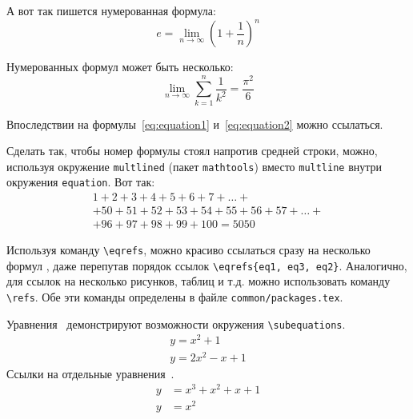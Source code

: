 А вот так пишется нумерованная формула:
\begin{equation}
  \label{eq:equation1}
  e = \lim_{n \to \infty} \left( 1+\frac{1}{n} \right) ^n
\end{equation}

Нумерованных формул может быть несколько:
\begin{equation}
  \label{eq:equation2}
  \lim_{n \to \infty} \sum_{k=1}^n \frac{1}{k^2} = \frac{\pi^2}{6}
\end{equation}

Впоследствии на формулы~\eqref{eq:equation1} и~\eqref{eq:equation2} можно ссылаться.

Сделать так, чтобы номер формулы стоял напротив средней строки, можно,
используя окружение \verb|multlined| (пакет \verb|mathtools|) вместо
\verb|multline| внутри окружения \verb|equation|. Вот так:
\begin{equation} %
  \label{eq:equation3}
    \begin{multlined}
        1+ 2+3+4+5+6+7+\dots + \\
        + 50+51+52+53+54+55+56+57 + \dots + \\
        + 96+97+98+99+100=5050
    \end{multlined}
\end{equation}

Используя команду \verb|\eqrefs|, можно
красиво ссылаться сразу на несколько формул
, даже перепутав
порядок ссылок \verb|\eqrefs{eq1, eq3, eq2}|.
Аналогично, для ссылок на несколько рисунков, таблиц и т.д.  можно использовать команду \verb|\refs|.
Обе эти команды определены в файле \verb|common/packages.tex|.

Уравнения~ демонстрируют возможности
окружения \verb|\subequations|.
\begin{subequations}
    \label{eq:subeq_1}
    \begin{gather}
        y = x^2 + 1 \label{eq:subeq_1-1} \\
        y = 2 x^2 - x + 1 \label{eq:subeq_1-2}
    \end{gather}
\end{subequations}
Ссылки на отдельные уравнения~.
\begin{subequations}
    \label{eq:subeq_2}
    \begin{align}
        y &= x^3 + x^2 + x + 1 \label{eq:subeq_2-1} \\
        y &= x^2
    \end{align}
\end{subequations}

